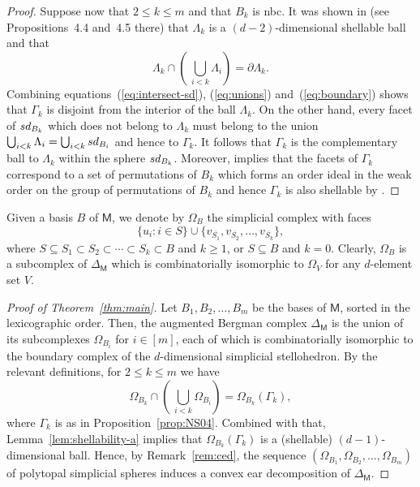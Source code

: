 \documentclass[11pt]{amsart}
\theoremstyle{theorems}
\theoremstyle{definition}
\newcommand{\sd}{{\rm sd}}
\newcommand{\M}{{\mathsf{M}}}
\begin{document}
\begin{proof}
    Suppose now that $2 \le k \le m$ and that $B_k$ is 
    nbc. It was shown in \cite[Section~4]{NS04} (see 
    Propositions~4.4 and~4.5 there) that $\Lambda_k$ 
    is a $(d-2)$-dimensional shellable ball and that 
    \begin{equation} \label{eq:boundary}
      \Lambda_k \cap \left( \, \bigcup_{i<k} 
      \Lambda_i \right) = \partial \Lambda_k.
    \end{equation}
    Combining equations~(\ref{eq:intersect-sd}), 
    (\ref{eq:unions}) and~(\ref{eq:boundary}) shows 
    that $\Gamma_k$ is disjoint from the interior of 
    the ball $\Lambda_k$. On the other hand, every 
    facet of $\sd_{B_k}$ which does not 
    belong to $\Lambda_k$ must belong to the union 
    $\bigcup_{i<k} \Lambda_i = \bigcup_{i<k} \sd_{B_i}$
    and hence to $\Gamma_k$. It follows that 
    $\Gamma_k$ is the complementary ball to 
    $\Lambda_k$ within the sphere $\sd_{B_k}$.
    Moreover, \cite[Lemma~4.3]{NS04} implies that 
    the facets of $\Gamma_k$ correspond to a set of 
    permutations of $B_k$ which forms an order ideal 
    in the weak order on the group of permutations 
    of $B_k$ and hence $\Gamma_k$ is also shellable 
    by \cite[Theorem~2.1]{Bj84}. 
\end{proof}

Given a basis $B$ of $\M$, we denote by $\Omega_B$ 
the simplicial complex with faces
%
\[ \{u_i : i \in S\} \cup \{ v_{\overline{S_1}}, 
     v_{\overline{S_2}},\dots,v_{\overline{S_k}} 
	 \}, \]
%
where $S \subseteq S_1 \subset S_2 \subset \cdots 
\subset S_k \subset B$ and $k \ge 1$, or $S 
\subseteq B$ and $k = 0$. Clearly, $\Omega_B$ is 
a subcomplex of $\Delta_{\M}$ which is 
combinatorially isomorphic to $\Omega_V$ for any 
$d$-element set $V$. 

\begin{proof}[Proof of Theorem~\ref{thm:main}]
Let $B_1, B_2,\dots,B_m$ be the bases of $\M$, 
sorted in the lexicographic order. Then, the 
augmented Bergman complex
$\Delta_{\M}$ is the union of its subcomplexes 
$\Omega_{B_i}$ for $i \in [m]$, each of which is 
combinatorially isomorphic to the boundary complex 
of the $d$-dimensional simplicial stellohedron. 
By the relevant definitions, for $2 \le k \le m$ 
we have
%
\begin{equation} \label{eq:intersect}
  \Omega_{B_k} \cap \left( \, \bigcup_{i<k} 
  \Omega_{B_i} \right) = \Omega_{B_k} (\Gamma_k), 
\end{equation}
% 
where $\Gamma_k$ is as in 
Proposition~\ref{prop:NS04}. Combined with that, 
Lemma~\ref{lem:shellability-a} implies that 
$\Omega_{B_k} (\Gamma_k)$ is a (shellable) 
$(d-1)$-dimensional ball. Hence, by Remark~\ref{rem:ced}, 
the sequence $(\Omega_{B_1}, \Omega_{B_2},\dots,\Omega_{B_m})$ 
of polytopal simplicial spheres induces a convex ear 
decomposition of $\Delta_{\M}$. 
\end{proof}
\end{document}
